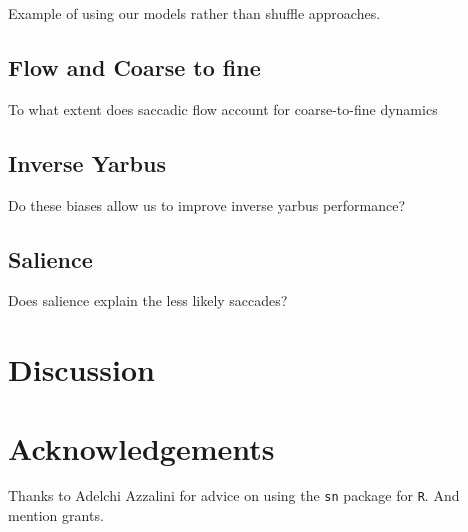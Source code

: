 \documentclass[a4paper, onecolumn, oneside, 11pt]{article}
\begin{document}
Example of using our models rather than shuffle approaches.

\subsection{Flow and Coarse to fine}
To what extent does saccadic flow account for coarse-to-fine dynamics

\subsection{Inverse Yarbus}

Do these biases allow us to improve inverse yarbus performance?

\subsection{Salience}

Does salience explain the less likely saccades? 

\section{Discussion}

\section*{Acknowledgements}

Thanks to Adelchi Azzalini for advice on using the \texttt{sn} package for \texttt{R}. And mention grants. 


\small

\end{document}
